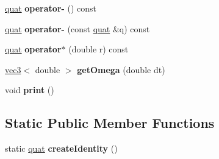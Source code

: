 \begin{DoxyCompactItemize}
\item 
\hypertarget{classmath_1_1quat_ae69bba247036e23346dbf296a51509dc}{
\hyperlink{classmath_1_1quat}{quat} {\bfseries operator-\/} () const }
\label{classmath_1_1quat_ae69bba247036e23346dbf296a51509dc}

\item 
\hypertarget{classmath_1_1quat_a9ea9666c97a538cf390c03a3341f80b3}{
\hyperlink{classmath_1_1quat}{quat} {\bfseries operator-\/} (const \hyperlink{classmath_1_1quat}{quat} \&q) const }
\label{classmath_1_1quat_a9ea9666c97a538cf390c03a3341f80b3}

\item 
\hypertarget{classmath_1_1quat_a1ce94da0a070e4fe4841a45a37af6ba6}{
\hyperlink{classmath_1_1quat}{quat} {\bfseries operator$\ast$} (double r) const }
\label{classmath_1_1quat_a1ce94da0a070e4fe4841a45a37af6ba6}

\item 
\hypertarget{classmath_1_1quat_af52c75ff74b56765f47a81d96dc9aba8}{
\hyperlink{classmath_1_1vec3}{vec3}$<$ double $>$ {\bfseries getOmega} (double dt)}
\label{classmath_1_1quat_af52c75ff74b56765f47a81d96dc9aba8}

\item 
\hypertarget{classmath_1_1quat_a3bd342a3da3dd15fa2fc9b183a2c44e3}{
void {\bfseries print} ()}
\label{classmath_1_1quat_a3bd342a3da3dd15fa2fc9b183a2c44e3}

\end{DoxyCompactItemize}
\subsection*{Static Public Member Functions}
\begin{DoxyCompactItemize}
\item 
\hypertarget{classmath_1_1quat_aaff302277219c07a8231956ae321ef79}{
static \hyperlink{classmath_1_1quat}{quat} {\bfseries createIdentity} ()}
\label{classmath_1_1quat_aaff302277219c07a8231956ae321ef79}

\end{DoxyCompactItemize}
